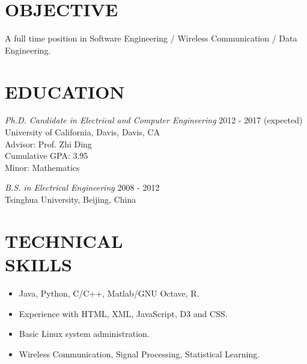 \documentclass[margin]{res} %
\begin{document}
    \begin{resume}

     
        \section{OBJECTIVE}  
        A full time position in Software Engineering / Wireless
        Communication / Data Engineering.
    
    
        \section{EDUCATION}
    
        {\sl Ph.D. Candidate in Electrical and Computer Engineering} \hfill 2012 -
        2017 (expected) \\
        University of California, Davis, Davis, CA \\
        Advisor: Prof. Zhi Ding \\
        Cumulative GPA: 3.95 \\
        Minor: Mathematics 
        
        {\sl B.S. in Electrical Engineering}  \hfill 2008 - 2012\\
        Tsinghua University, Beijing, China
       
    
        \section{TECHNICAL \\ SKILLS}
        
        \begin{itemize}
            \item Java, Python, C/C++, Matlab/GNU Octave, R.
            \item Experience with HTML, XML, JavaScript, D3 and CSS.
            \item Basic Linux system administration.
            \item Wireless Communication, Signal Processing, Statistical
            Learning.
        \end{itemize} 
    

\end{resume}
\end{document}
